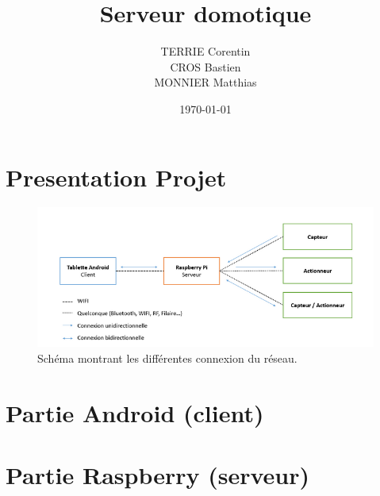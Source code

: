 \documentclass[a4paper,10pt]{article}
\title{Serveur domotique}
\author{TERRIE Corentin \\ CROS Bastien \\ MONNIER Matthias}
\date{\today}
\begin{document}

\tableofcontents
\clearpage


\section{Presentation Projet}

\begin{figure}[H]
\centering\includegraphics[scale=0.7]{images/Shema_projet.png}
\caption{Schéma montrant les différentes connexion du réseau.}
\end{figure}


\section{Partie Android (client)}




\section{Partie Raspberry (serveur)}
\end{document}
